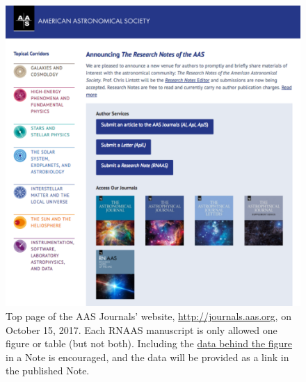 \documentclass[RNAAS]{aastex62}
\begin{document}
\begin{figure}[h!]
\begin{center}
\includegraphics[scale=0.85,angle=0]{aas.pdf}
\caption{Top page of the AAS Journals' website, \url{http://journals.aas.org},
on October 15, 2017.  Each RNAAS manuscript is only allowed one figure or
table (but not both). Including the
\href{http://journals.aas.org//authors/data.html\#DbF}{data behind the figure}
in a Note is encouraged, and the data will be provided as a link in the
published Note.\label{fig:1}}
\end{center}
\end{figure}

\end{document}
